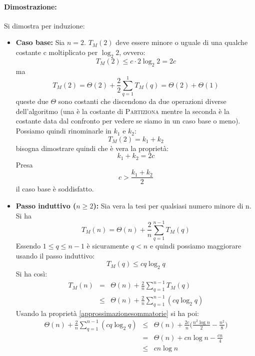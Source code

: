 \paragraph{Dimostrazione:}
	Si dimostra per induzione:
	\begin{itemize}
		\item \textbf{Caso base:} Sia $n=2$. $T_{M}(2)$ deve essere minore o uguale di una qualche costante c moltiplicato per $\log_{2}2$, ovvero:
		\begin{displaymath}
			T_{M}(2) \leq c \cdot 2 \log_{2} 2 = 2c
		\end{displaymath}
		ma $$T_{M}(2) = \Theta(2) + \frac{2}{2}\sum_{q=1}^{1}T_{M}(q) =\Theta(2)+\Theta(1)$$
		queste due $	\Theta$ sono costanti che discendono da due operazioni diverse dell'algoritmo (una è la costante di \textsc{Partiziona} mentre la seconda è la costante data dal confronto per vedere se siamo in un caso base o meno). Possiamo quindi rinominarle in $k_{1}$ e $k_{2}$:
		\begin{displaymath}
			T_{M}(2)=k_{1}+k_{2}
		\end{displaymath}
		bisogna dimostrare quindi che è vera la proprietà: $$k_{1}+k_{2}=2c$$
		Presa
		\begin{equation}
			c > \frac{k_{1}+k_{2}}{2}
		\end{equation}
		il caso base è soddisfatto.
		\item \textbf{Passo induttivo ($n \geq 2$): }Sia vera la tesi per qualsiasi numero minore di n.
		Si ha \begin{displaymath}
			T_{M}(n)=\Theta(n)+\frac{2}{n}\sum_{q=1}^{n-1}T_{M}(q)
		\end{displaymath}
		Essendo $1 \leq q \leq n-1$ è sicuramente $q <n$ e quindi possiamo maggiorare usando il passo induttivo: $$T_{M}(q) \leq cq \log_{2}q$$  Si ha così:
		\begin{eqnarray}
			T_{M}(n)&=&\Theta(n)+\frac{2}{n}\sum_{q=1}^{n-1}T_{M}(q) \nonumber \\
			&\leq &\Theta(n)+\frac{2}{n}\sum_{q=1}^{n-1}(cq\log_{2}q)
		\end{eqnarray}
		Usando la proprietà \ref{approssimazionesommatorie} si ha poi:
		\begin{eqnarray}
			\Theta(n)+\frac{2}{n}\sum_{q=1}^{n-1}(cq\log_{2}q) &\leq & \Theta(n)+\frac{2c}{n}\bigl(\frac{n^{2}\log n}{2}-\frac{n^{2}}{8}\bigr) \nonumber \\
			&=& \Theta(n)+cn\log n - \frac{cn}{4} \nonumber \\
			&\leq & cn\log n
		\end{eqnarray}
	\end{itemize}

